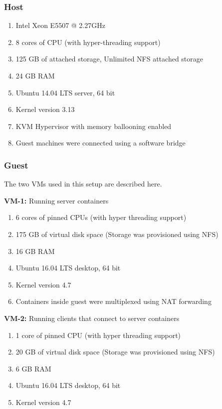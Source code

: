       \subsubsection{Host}
	
	\begin{enumerate}
	  \item Intel Xeon E5507 @ 2.27GHz
	  \item 8 cores of CPU (with hyper-threading support)
	  \item 125 GB of attached storage, Unlimited NFS attached storage 
	  \item 24 GB RAM
	  \item Ubuntu 14.04 LTS server, 64 bit 
	  \item Kernel version 3.13
	  \item KVM Hypervisor with memory ballooning enabled
	  \item Guest machines were connected using a software bridge
	\end{enumerate}
      
      \subsubsection{Guest}
	
	The two VMs used in this setup are described here.
	
	\noindent \textbf{VM-1:} Running server containers
	\begin{enumerate}
	  \item 6 cores of pinned CPUs (with hyper threading support)
	  \item 175 GB of virtual disk space (Storage was provisioned using NFS)
	  \item 16 GB RAM
	  \item Ubuntu 16.04 LTS desktop, 64 bit
	  \item Kernel version 4.7
	  \item Containers inside guest were multiplexed using NAT forwarding
	\end{enumerate}
	
	\noindent \textbf{VM-2:} Running clients that connect to server containers
	\begin{enumerate}
	  \item 1 core of pinned CPU (with hyper threading support)
	  \item 20 GB of virtual disk space (Storage was provisioned using NFS)
	  \item 6 GB RAM
	  \item Ubuntu 16.04 LTS desktop, 64 bit
	  \item Kernel version 4.7
	\end{enumerate}
	
